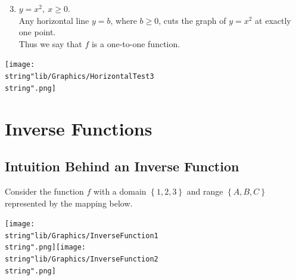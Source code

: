 \documentclass[11pt,a4paper]{book}
\begin{document}
\begin{example}{}
\begin{minipage}[t]{0.1\textwidth}
\end{minipage}

\begin{minipage}[t]{0.6\textwidth}

\begin{enumerate}[label=(\alph*)]

\setcounter{enumi}{2}

\item  $y=x^{2},\:x\geq0$. \\
Any horizontal line $y=b$, where $b\geq0$, cuts the graph of $y=x^{2}$
at exactly one point. \\
Thus we say that $f$ is a one-to-one function.

\end{enumerate}

\end{minipage}
\begin{minipage}[t]{0.1\textwidth}
\begin{center}
\texttt{[image: \\string"lib/Graphics/HorizontalTest3\\string".png]}
\par\end{center}

\end{minipage}

\end{example}

\newpage


\section{Inverse Functions}

\subsection{Intuition Behind an Inverse Function}

Consider the function $f$ with a domain $\left\{ 1,2,3\right\} $
and range $\left\{ A,B,C\right\} $ represented by the mapping below.
\begin{center}
\texttt{[image: \\string"lib/Graphics/InverseFunction1\\string".png]}\hspace{3cm}\texttt{[image: \\string"lib/Graphics/InverseFunction2\\string".png]}
\par\end{center}
\end{document}

